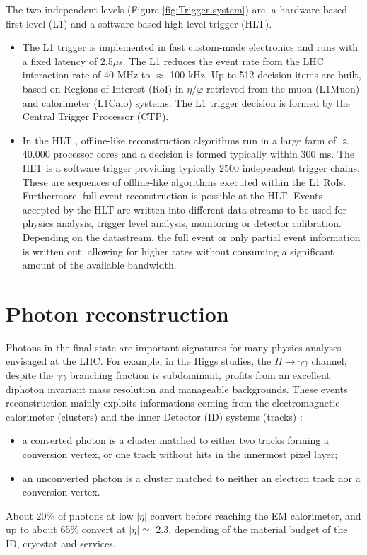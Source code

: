 \documentclass[a4paper, oneside, 11pt, openright]{book}
\begin{document}
				The two independent levels (Figure \ref{fig:Trigger system}) are, a hardware-based first level (L1) and a software-based high level trigger (HLT). 
				\begin{itemize}
					\item The L1 trigger \cite{L1_trigger} is implemented in fast custom-made electronics and runs with a fixed latency of 2.5$\mu$s. The L1 reduces the event rate from the LHC interaction rate of 40 MHz to $\approx$ 100 kHz. Up to 512 decision items are built, based on Regions of Interest (RoI) in $\eta/\varphi$ retrieved from the muon (L1Muon) and calorimeter (L1Calo) systems. The L1 trigger decision is formed by the Central Trigger Processor (CTP). %
					
					\item In the HLT \cite{HLT_trigger}, offline-like reconstruction algorithms run in a large farm of $\approx$ 40.000 processor cores and a decision is formed typically within 300 ms. The HLT is a software trigger providing typically 2500 independent trigger chains. These are sequences of offline-like algorithms executed within the L1 RoIs. Furthermore, full-event reconstruction is possible at the HLT. Events accepted by the HLT are written into different data streams to be used for physics analysis, trigger level analysis, monitoring or detector calibration. Depending on the datastream, the full event or only partial event information is written out, allowing for higher rates without consuming a significant amount of the available bandwidth.
				\end{itemize}
		
	
	\chapter{Photon reconstruction}\label{chapter:ph_reco}
		Photons in the final state are important signatures for many physics analyses envisaged at the LHC. For example, in the Higgs studies, the $H \to \gamma\gamma$ channel, despite the $\gamma\gamma$ branching fraction is subdominant, profits from an excellent diphoton invariant mass resolution and manageable backgrounds. These events reconstruction mainly exploits informations coming from the electromagnetic calorimeter (clusters) and the Inner Detector (ID) systems (tracks) \cite{Aad_2019}:
		\begin{itemize}
			\item a converted photon is a cluster matched to either two tracks forming a conversion vertex, or one track without hits in the innermost pixel layer;
			\item an unconverted photon is a cluster matched to neither an electron track nor a conversion vertex.
		\end{itemize}
		About 20\% of photons at low $|\eta|$ convert before reaching the EM calorimeter, and up to about 65\% convert at $|\eta| \simeq$ 2.3, depending of the material budget of the ID, cryostat and services.
		
\end{document}
